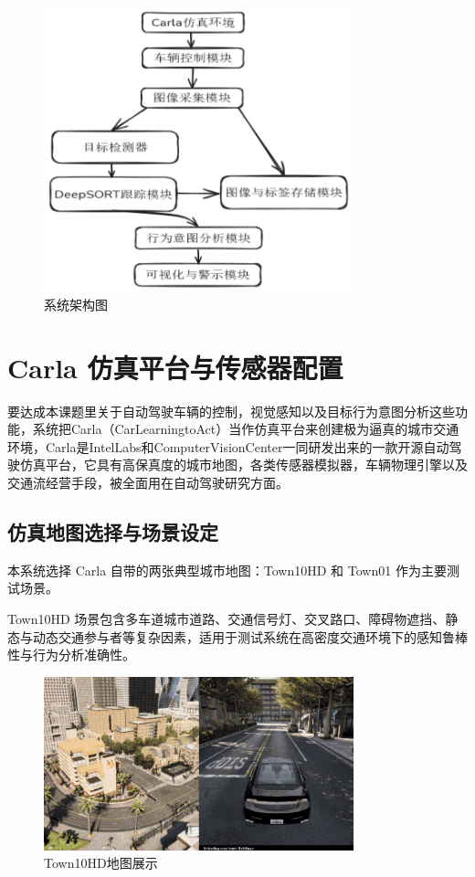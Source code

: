 \begin{figure}[H]
    \centering
    \includegraphics[width=0.8\textwidth]{images/图3 系统架构图.pdf}  %
    \caption{系统架构图}
    \label{fig:example_image}  %
\end{figure}

\section{Carla 仿真平台与传感器配置}

要达成本课题里关于自动驾驶车辆的控制，视觉感知以及目标行为意图分析这些功能，系统把Carla（CarLearningtoAct）当作仿真平台来创建极为逼真的城市交通环境，Carla是IntelLabs和ComputerVisionCenter一同研发出来的一款开源自动驾驶仿真平台，它具有高保真度的城市地图，各类传感器模拟器，车辆物理引擎以及交通流经营手段，被全面用在自动驾驶研究方面。

\subsection{仿真地图选择与场景设定}

本系统选择 Carla 自带的两张典型城市地图：Town10HD 和 Town01 作为主要测试场景。

Town10HD 场景包含多车道城市道路、交通信号灯、交叉路口、障碍物遮挡、静态与动态交通参与者等复杂因素，适用于测试系统在高密度交通环境下的感知鲁棒性与行为分析准确性。

\begin{figure}[H]
    \centering
    \includegraphics[width=0.8\textwidth]{images/图4 Town10HD地图展示.pdf}  %
    \caption{Town10HD地图展示}
    \label{fig:example_image}  %
\end{figure}

